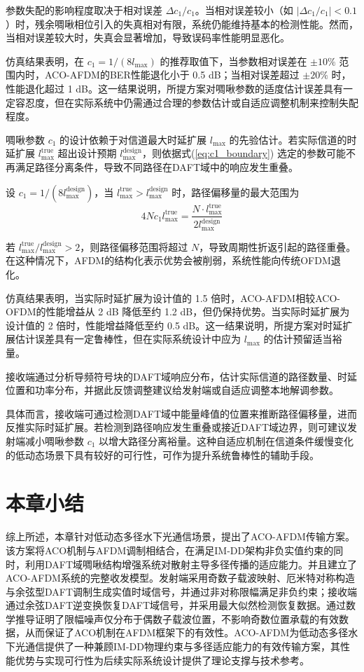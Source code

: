 参数失配的影响程度取决于相对误差 $\Delta c_1 / c_1$。当相对误差较小（如 $|\Delta c_1 / c_1| < 0.1$）时，残余啁啾相位引入的失真相对有限，系统仍能维持基本的检测性能。然而，当相对误差较大时，失真会显著增加，导致误码率性能明显恶化。

仿真结果表明，在 $c_1 = 1/(8l_{\max})$ 的推荐取值下，当参数相对误差在 $\pm 10\%$ 范围内时，ACO-AFDM的BER性能退化小于 0.5 dB；当相对误差超过 $\pm 20\%$ 时，性能退化超过 1 dB。这一结果说明，所提方案对啁啾参数的适度估计误差具有一定容忍度，但在实际系统中仍需通过合理的参数估计或自适应调整机制来控制失配程度。


啁啾参数 $c_1$ 的设计依赖于对信道最大时延扩展 $l_{\max}$ 的先验估计。若实际信道的时延扩展 $l_{\max}^{\mathrm{true}}$ 超出设计预期 $l_{\max}^{\mathrm{design}}$，则依据式(\ref{eq:c1_boundary}) 选定的参数可能不再满足路径分离条件，导致不同路径在DAFT域中的响应发生重叠。

设 $c_1 = 1/(8l_{\max}^{\mathrm{design}})$，当 $l_{\max}^{\mathrm{true}} > l_{\max}^{\mathrm{design}}$ 时，路径偏移量的最大范围为
\begin{equation}
4Nc_1 l_{\max}^{\mathrm{true}} = \frac{N \cdot l_{\max}^{\mathrm{true}}}{2l_{\max}^{\mathrm{design}}}
\end{equation}

若 $l_{\max}^{\mathrm{true}} / l_{\max}^{\mathrm{design}} > 2$，则路径偏移范围将超过 $N$，导致周期性折返引起的路径重叠。在这种情况下，AFDM的结构化表示优势会被削弱，系统性能向传统OFDM退化。

仿真结果表明，当实际时延扩展为设计值的 1.5 倍时，ACO-AFDM相较ACO-OFDM的性能增益从 2 dB 降低至约 1.2 dB，但仍保持优势。当实际时延扩展为设计值的 2 倍时，性能增益降低至约 0.5 dB。这一结果说明，所提方案对时延扩展估计误差具有一定鲁棒性，但在实际系统设计中应为 $l_{\max}$ 的估计预留适当裕量。



接收端通过分析导频符号块的DAFT域响应分布，估计实际信道的路径数量、时延位置和功率分布，并据此反馈调整建议给发射端或自适应调整本地解调参数。

具体而言，接收端可通过检测DAFT域中能量峰值的位置来推断路径偏移量，进而反推实际时延扩展。若检测到路径响应发生重叠或接近DAFT域边界，则可建议发射端减小啁啾参数 $c_1$ 以增大路径分离裕量。这种自适应机制在信道条件缓慢变化的低动态场景下具有较好的可行性，可作为提升系统鲁棒性的辅助手段。


\section{本章小结}
综上所述，本章针对低动态多径水下光通信场景，提出了ACO-AFDM传输方案。该方案将ACO机制与AFDM调制相结合，在满足IM-DD架构非负实值约束的同时，利用DAFT域啁啾结构增强系统对散射主导多径传播的适应能力。并且建立了ACO-AFDM系统的完整收发模型。发射端采用奇数子载波映射、厄米特对称构造与余弦型DAFT调制生成实值时域信号，并通过非对称限幅满足非负约束；接收端通过余弦DAFT逆变换恢复DAFT域信号，并采用最大似然检测恢复数据。通过数学推导证明了限幅噪声仅分布于偶数子载波位置，不影响奇数位置承载的有效数据，从而保证了ACO机制在AFDM框架下的有效性。ACO-AFDM为低动态多径水下光通信提供了一种兼顾IM-DD物理约束与多径适应能力的有效传输方案，其性能优势与实现可行性为后续实际系统设计提供了理论支撑与技术参考。

 